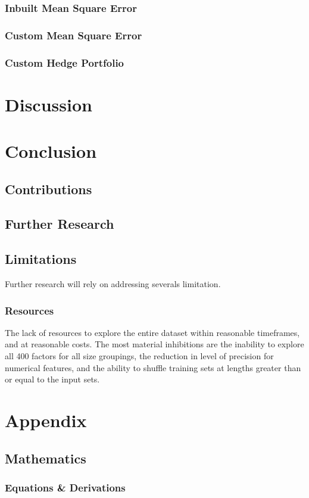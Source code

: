 \documentclass[12pt]{article}
\begin{document}
{\subsubsection{Inbuilt Mean Square Error}
\subsubsection{Custom Mean Square Error}
\subsubsection{Custom Hedge Portfolio}
\newpage
\section{Discussion}
\section{Conclusion}
\subsection{Contributions}
\subsection{Further Research}
\subsection{Limitations}
Further research will rely on addressing severals limitation.
\subsubsection{Resources}
The lack of resources to explore the entire dataset within reasonable timeframes, and at reasonable costs.
The most material inhibitions are the inability to explore all 400 factors for all size groupings, the reduction in level of precision for numerical features, and
the ability to shuffle training sets at lengths greater than or equal to the input sets.
\newpage
\printbibliography
\newpage
\section{Appendix}
\subsection{Mathematics}
\subsubsection{Equations \& Derivations}

}
\end{document}

